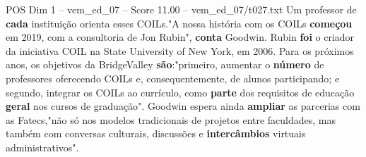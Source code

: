 \begin{textsample}{POS Dim 1 – vem\_ed\_07 – Score 11.00 – vem\_ed\_07/t027.txt}
Um professor de \textbf{cada} instituição orienta esses COILs."A nossa história com os COILs \textbf{começou} em 2019, com a consultoria de Jon Rubin", \textbf{conta} Goodwin.
Rubin \textbf{foi} o criador da iniciativa COIL na State University of New York, em 2006.
Para os próximos anos, os objetivos da BridgeValley \textbf{são}:"primeiro, aumentar o \textbf{número} de professores oferecendo COILs e, consequentemente, de alunos participando; e segundo, integrar os COILs ao currículo, como \textbf{parte} dos requisitos de educação \textbf{geral} nos cursos de graduação".
Goodwin espera ainda \textbf{ampliar} as parcerias com as Fatecs,"não só nos modelos tradicionais de projetos entre faculdades, mas também com conversas culturais, discussões e \textbf{intercâmbios} virtuais administrativos".

\end{textsample}
